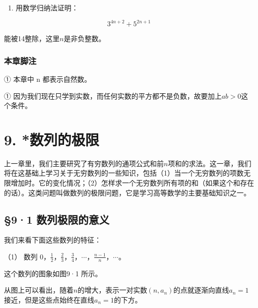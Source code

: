 \begin{enumerate}[start=6]
\item
  用数学归纳法证明：
\end{enumerate}

\[
3^{4 n + 2} + 5^{2 n + 1}
\]

能被14整除，这里\(n\)是非负整数。

\subsection{本章脚注}

① 本章中 n 都表示自然数。

①
因为我们现在只学到实数，而任何实数的平方都不是负数，故要加上\(ab > 0\)这个条件。

\chapter{9. *数列的极限}

上一章里，我们主要研究了有穷数列的通项公式和前\(n\)项和的求法。这一章，我们将在这基础上学习关于无穷数列的一些知识，包括（1）当一个无穷数列的项数无限增加时。它的变化情况；（2）怎样求一个无穷数列所有项的和（如果这个和存在的话）。这类问题叫做数列的极限问题，它是学习高等数学的主要基础知识之一。

\section{§9·1 数列极限的意义}

我们来看下面这些数列的特征：

（1） 数列
0，\(\frac{1}{2}\)，\(\frac{2}{3}\)，\(\frac{3}{4}\)，\(\cdots\)，\(\frac{n-1}{n}\)，\(\cdots\)。

这个数列的图象如图9·1 所示。

从图上可以看出，随着\(n\)的增大，表示一对实数\((n, a_n)\)的点就逐渐向直线\(a_n = 1\)接近，但是这些点始终在直线\(a_n = 1\)的下方。

